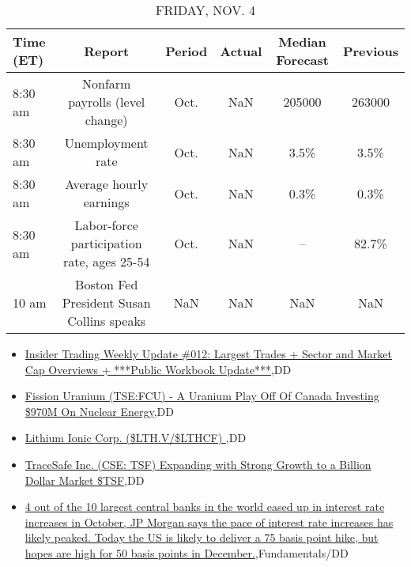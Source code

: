 \documentclass{article}%
\begin{document}
%


\begin{table}[htbp]%
\caption{FRIDAY, NOV. 4}%
\centering%
\begin{adjustbox}{width=1\textwidth}%
\begin{tabular}{lccccc}
\toprule
Time (ET) &                                     Report & Period & Actual & Median Forecast & Previous \\
\midrule
  8:30 am &            Nonfarm payrolls (level change) &   Oct. &    NaN &          205000 &   263000 \\
  8:30 am &                          Unemployment rate &   Oct. &    NaN &            3.5\% &     3.5\% \\
  8:30 am &                    Average hourly earnings &   Oct. &    NaN &            0.3\% &     0.3\% \\
  8:30 am & Labor-force participation rate, ages 25-54 &   Oct. &    NaN &              -- &    82.7\% \\
    10 am &  Boston Fed President Susan Collins speaks &    NaN &    NaN &             NaN &      NaN \\
\bottomrule
\end{tabular}
%
\end{adjustbox}%
\end{table}

%
\begin{itemize}%
\item%
\href{https://reddit.com/r/wallstreetbets/comments/yk4zna/insider\_trading\_weekly\_update\_012\_largest\_trades/}{Insider Trading Weekly Update \#012: Largest Trades + Sector and Market Cap Overviews + ***Public Workbook Update***},DD%
\item%
\href{https://reddit.com/r/Baystreetbets/comments/yjuz4h/fission\_uranium\_tsefcu\_a\_uranium\_play\_off\_of/}{Fission Uranium (TSE:FCU) - A Uranium Play Off Of Canada Investing \$970M On Nuclear Energy},DD%
\item%
\href{https://reddit.com/r/Baystreetbets/comments/yjjzu4/lithium\_ionic\_corp\_lthvlthcf/}{Lithium Ionic Corp. (\$LTH.V/\$LTHCF) },DD%
\item%
\href{https://reddit.com/r/Baystreetbets/comments/yjfoyf/tracesafe\_inc\_cse\_tsf\_expanding\_with\_strong/}{TraceSafe Inc. (CSE: TSF) Expanding with Strong Growth to a Billion Dollar Market \$TSF},DD%
\item%
\href{https://reddit.com/r/StockMarket/comments/yk2xct/4\_out\_of\_the\_10\_largest\_central\_banks\_in\_the/}{4 out of the 10 largest central banks in the world eased up in interest rate increases in October, JP Morgan says the pace of interest rate increases has likely peaked. Today the US is likely to deliver a 75 basis point hike, but hopes are high for 50 basis points in December.},Fundamentals/DD%
\end{itemize}%
\end{document}
